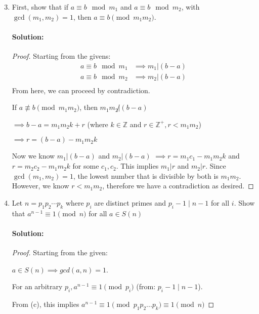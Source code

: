 \documentclass[11pt, notitlepage]{report}
\newcommand{\Z}{\mathbb{Z}}
\newenvironment{solution}{\paragraph{Solution:}}{\hfill}
\begin{document}
\begin{enumerate}[label=\alph*.)]\setcounter{enumi}{2}
    \item First, show that if $a \equiv b \mod m_1$ and $a \equiv b \mod m_2$, with $\gcd(m_1, m_2)=1$, then $a \equiv b \pmod{m_1 m_2}$.
	\begin{solution}
	\begin{proof}
	Starting from the givens:
		\begin{align*}
			a \equiv b \mod m_1 &\implies m_1 | (b-a)\\
			a \equiv b \mod m_2 &\implies m_2 | (b-a)\\
		\end{align*}
	From here, we can proceed by contradiction. 
	
	If $a \not\equiv b \pmod{m_1 m_2}$, then $m_1 m_2\not|(b-a)$
	
	$\implies b-a=m_1m_2k+r$ (where $k\in \Z$ and $r \in \Z^+, r<m_1m_2$)
	
	$\implies r = (b-a) -m_1m_2k$
	
	Now we know $m_1 | (b-a)$ and $m_2 | (b-a)$  
	$\implies r = m_1c_1 -m_1m_2k$ and $r = m_2c_2 -m_1m_2k$ for some $c_1,c_2$. This implies $m_1|r$ and $m_2|r$. Since $\gcd(m_1, m_2)=1$, the lowest number that is divisible by both is $m_1m_2$. However, we know $r<m_1m_2$, therefore we have a contradiction as desired.
	\end{proof}
	\end{solution}

    \item Let $n = p_1 p_2 \cdots p_k$ where $p_i$ are distinct primes and $p_i - 1 \mid n - 1$ for all $i$. Show that $a^{n-1} \equiv 1 \pmod{n}$ for all $a \in S(n)$ 
	\begin{solution}
		\begin{proof}
			Starting from the given: 
			
			$a\in S(n) \implies gcd(a,n)=1$.
			
			For an arbitrary $p_i, a^{n-1}\equiv 1 \pmod{p_i}$ (from: $p_i - 1 \mid n - 1$).
			
			From (c), this implies $a^{n-1}\equiv 1 \pmod{p_1p_2...p_k}\equiv 1 \pmod{n}$
		\end{proof}
	\end{solution}

    
    


\end{enumerate}
\end{document}
